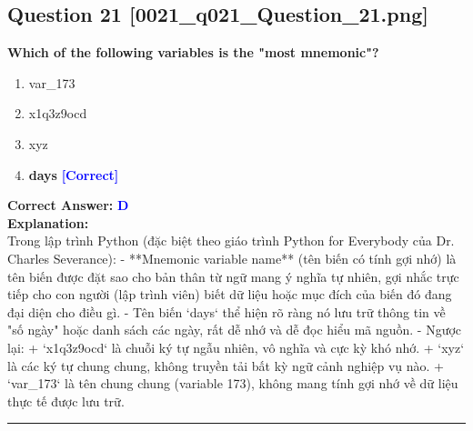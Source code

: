 \documentclass[11pt,a4paper]{article}
\begin{document}
\begin{minipage}{\textwidth}
\subsection*{Question 21 \quad \footnotesize{[0021_q021_Question_21.png]}}
\noindent \textbf{Which of the following variables is the "most mnemonic"?}

\begin{enumerate}[label=\Alph*.]
    \item var_173
    \item x1q3z9ocd
    \item xyz
    \item \textbf{days} \hfill \textcolor{blue}{\textbf{[Correct]}}
\end{enumerate}

\noindent \textbf{Correct Answer:} \textcolor{blue}{\textbf{D}} \\[4pt]
\noindent \textbf{Explanation:}\\
Trong lập trình Python (đặc biệt theo giáo trình Python for Everybody của Dr. Charles Severance):\newline
- **Mnemonic variable name** (tên biến có tính gợi nhớ) là tên biến được đặt sao cho bản thân từ ngữ mang ý nghĩa tự nhiên, gợi nhắc trực tiếp cho con người (lập trình viên) biết dữ liệu hoặc mục đích của biến đó đang đại diện cho điều gì.\newline
- Tên biến `days` thể hiện rõ ràng nó lưu trữ thông tin về "số ngày" hoặc danh sách các ngày, rất dễ nhớ và dễ đọc hiểu mã nguồn.\newline
- Ngược lại:\newline
  + `x1q3z9ocd` là chuỗi ký tự ngẫu nhiên, vô nghĩa và cực kỳ khó nhớ.\newline
  + `xyz` là các ký tự chung chung, không truyền tải bất kỳ ngữ cảnh nghiệp vụ nào.\newline
  + `var_173` là tên chung chung (variable 173), không mang tính gợi nhớ về dữ liệu thực tế được lưu trữ.
\end{minipage}
\vspace{0.8cm}
\hrule
\vspace{0.5cm}
\end{document}
